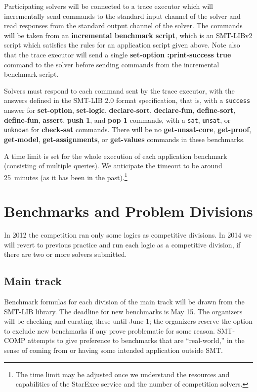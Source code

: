 \documentclass[12pt]{article}
\newcommand{\akey}[1]{\textbf{#1}}
\begin{document}
Participating solvers will be connected to a trace executor 
which will incrementally send commands to the standard input channel of the solver
and read responses from the standard output channel of the solver.
The commands will be taken from an \textbf{incremental benchmark script},
which is an SMT-LIBv2 script which satisfies the rules for an application script given above.
Note also that the trace executor will send a single 
\akey{set-option :print-success true} command to the solver before 
sending commands from the incremental benchmark script.

\medskip
Solvers must respond to each command sent by the trace executor, 
with the answers defined in the SMT-LIB 2.0 format specification, that is,
with a \texttt{success} answer for 
\akey{set-option}, 
\akey{set-logic}, 
\akey{declare-sort}, 
\akey{declare-fun}, 
\akey{define-sort}, 
\akey{define-fun}, 
\akey{assert}, 
\akey{push 1}, 
and \akey{pop 1} 
commands,
 with a \texttt{sat}, \texttt{unsat}, or \texttt{unknown} 
for \akey{check-sat} commands. There will be no \akey{get-unsat-core}, \akey{get-proof}, \akey{get-model}, \akey{get-assignments}, or \akey{get-values} commands in these benchmarks.

A time limit is set for the whole execution of each application
benchmark (consisting of multiple queries).  We anticipate the
timeout to be around 25~minutes (as it has been in the past).\footnote{The time limit may be adjusted once we understand the resources and capabilities of the StarExec service and the number of competition solvers.}



\section{Benchmarks and Problem Divisions}
\label{sec:theories}

In 2012 the competition ran only some logics as competitive divisions.
In 2014 we will revert to previous practice and run each logic as a competitive division, if there are two or more solvers submitted.

\subsection{Main track}

Benchmark formulas for each division of the main track
will be drawn from the SMT-LIB library. The deadline for new benchmarks is
May 15. The organizers will be checking and curating these until June 1;
the organizers reserve the option to exclude new benchmarks if any prove problematic for some reason.
SMT-COMP
attempts to give preference to benchmarks that are ``real-world,'' in
the sense of coming from or having some intended application outside
SMT.
\end{document}
